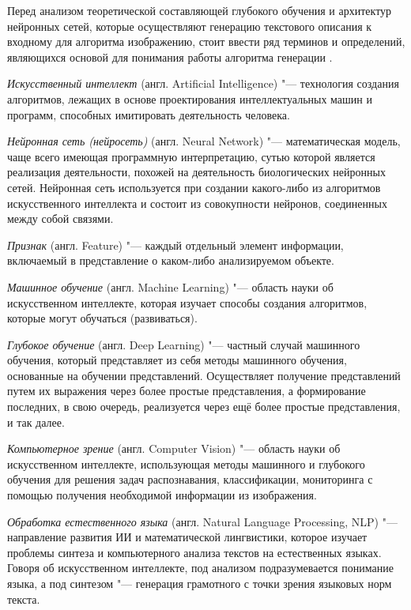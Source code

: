 \documentclass[bachelor, och, coursework]{SCWorks}
\begin{document}

    Перед анализом теоретической составляющей глубокого обучения и архитектур
    нейронных сетей, которые осуществляют генерацию текстового описания к
    входному для алгоритма изображению, стоит ввести ряд терминов и определений,
    являющихся основой для понимания работы алгоритма генерации \cite{Gud}.

    \textit{Искусственный интеллект} (англ. Artificial Intelligence) "---
    технология создания алгоритмов, лежащих в основе проектирования
    интеллектуальных машин и программ, способных имитировать деятельность
    человека.

    \textit{Нейронная сеть (нейросеть)} (англ. Neural Network) "---
    математическая модель, чаще всего имеющая программную интерпретацию, сутью
    которой является реализация деятельности, похожей на деятельность
    биологических нейронных сетей. Нейронная сеть используется при создании
    какого-либо из алгоритмов искусственного интеллекта и состоит из
    совокупности нейронов, соединенных между собой связями. 

    \textit{Признак} (англ. Feature) "--- каждый отдельный элемент информации,
    включаемый в представление о каком-либо анализируемом объекте.

    \textit{Машинное обучение} (англ. Machine Learning) "--- область науки об
    искусственном интеллекте, которая изучает способы создания алгоритмов,
    которые могут обучаться (развиваться).

    \textit{Глубокое обучение} (англ. Deep Learning) "--- частный случай
    машинного обучения, который представляет из себя методы машинного обучения,
    основанные на обучении представлений. Осуществляет получение представлений
    путем их выражения через более простые представления, а формирование
    последних, в свою очередь, реализуется через ещё более простые
    представления, и так далее.

    \textit{Компьютерное зрение} (англ. Computer Vision) "--- область науки об
    искусственном интеллекте, использующая методы машинного и глубокого обучения
    для решения задач распознавания, классификации, мониторинга с помощью
    получения необходимой информации из изображения.

    \textit{Обработка естественного языка} (англ. Natural Language Processing,
    NLP) "--- направление развития ИИ и математической лингвистики, которое
    изучает проблемы синтеза и компьютерного анализа текстов на естественных
    языках. Говоря об искусственном интеллекте, под анализом подразумевается
    понимание языка, а под синтезом "--- генерация грамотного с точки зрения
    языковых норм текста.
\end{document}
